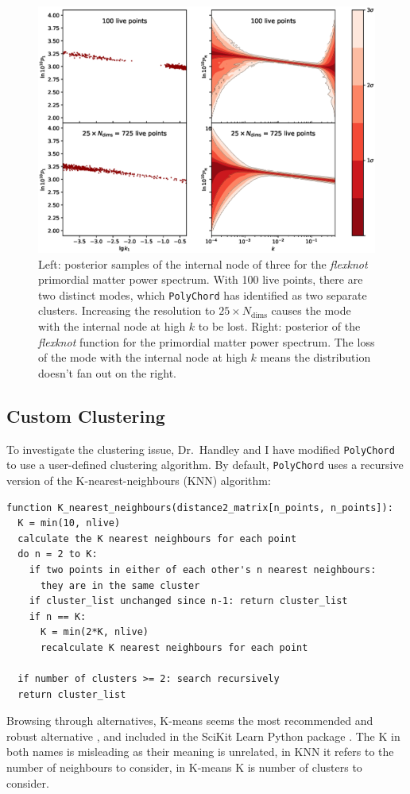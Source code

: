 \documentclass{article}
\begin{document}
\begin{figure}[!ht]
  \centering
  \includegraphics[width=15cm]{N3comparison.eps}
  \caption{Left: posterior samples of the internal node of three for the \textit{flexknot} primordial matter power spectrum. With 100 live points, there are two distinct modes, which \texttt{PolyChord} has identified as two separate clusters. Increasing the resolution to $25 \times N_\textrm{dims}$ causes the mode with the internal node at high $k$ to be lost. Right: posterior of the \textit{flexknot} function for the primordial matter power spectrum. The loss of the mode with the internal node at high $k$ means the distribution doesn't fan out on the right.}
  \label{fig:N3}
\end{figure}

\newpage

\subsection{Custom Clustering}
To investigate the clustering issue, Dr.~Handley and I have modified \texttt{PolyChord} to use a user-defined clustering algorithm. By default, \texttt{PolyChord} uses a recursive version of the K-nearest-neighbours (KNN) algorithm:
\begin{verbatim}
function K_nearest_neighbours(distance2_matrix[n_points, n_points]):
  K = min(10, nlive)
  calculate the K nearest neighbours for each point
  do n = 2 to K:
    if two points in either of each other's n nearest neighbours: 
      they are in the same cluster
    if cluster_list unchanged since n-1: return cluster_list
    if n == K: 
      K = min(2*K, nlive)
      recalculate K nearest neighbours for each point
    
  if number of clusters >= 2: search recursively
  return cluster_list
\end{verbatim}
Browsing through alternatives, K-means seems the most recommended and robust alternative \cite{MacKay2003}, and included in the SciKit Learn Python package \cite{scikit-learn}. The K in both names is misleading as their meaning is unrelated, in KNN it refers to the number of neighbours to consider, in K-means K is number of clusters to consider.
\end{document}
